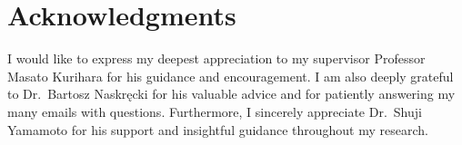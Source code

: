 \documentclass[main]{subfiles}
\begin{document}
{}
\section*{Acknowledgments}
I would like to express my deepest appreciation to my supervisor Professor Masato Kurihara for his guidance and encouragement.
I am also deeply grateful to Dr.~Bartosz Naskręcki for his valuable advice and for patiently answering my many emails with questions.  
Furthermore, I sincerely appreciate Dr.~Shuji Yamamoto for his support and insightful guidance throughout my research.
\end{document}
